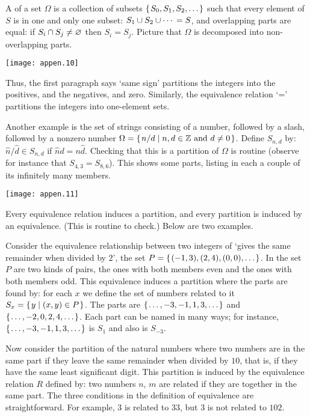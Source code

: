 A  
of a set \( \Omega \) is a collection of subsets
\( \mbox{$\{\hspace{0.1em}S_0,S_1,S_2,\ldots\hspace{0.1em}\}$} \) such that
every element of \( S \) is in one and only one subset:
\( S_1\cup S_2\cup \cdots{} = S \), and overlapping parts are equal:
if \( S_i\cap S_j\neq\varnothing \) then $S_i=S_j$.
Picture that \( \Omega \) is decomposed into non-overlapping parts.
\begin{center}
  \texttt{[image: appen.10]}
\end{center}
Thus, the first paragraph says `same sign' partitions
the integers into the positives, and the negatives, and zero.
Similarly, the equivalence relation `=' partitions the integers into
one-element sets.

Another example is the set of strings consisting of a number, followed
by a slash,
followed by a nonzero number
$\Omega=\mbox{$\{\hspace{0.1em}n/d\mid \text{$n,d\in\mathbb{Z}$ and $d\neq 0$}\hspace{0.1em}\}$}$.
Define $S_{n,d}$ by: $\hat{n}/\hat{d}\in S_{n,d}$ if 
$\hat{n}d=n\hat{d}$.
Checking that this is a partition of $\Omega$ is routine
(observe for instance that $S_{4,3}=S_{8,6}$).
This shows some parts, listing in each a couple of its infinitely many members. 
\begin{center}
  \texttt{[image: appen.11]}
\end{center}

Every equivalence relation induces a partition, and every 
partition is induced by an equivalence.
(This is routine to check.)
Below are two examples.
 
Consider the equivalence relationship between two integers of 
`gives the same remainder when divided by \( 2 \)',
the set \( P=\mbox{$\{\hspace{0.1em} (-1,3),(2,4),(0,0),\ldots\hspace{0.1em}\}$} \).
In the set $P$ are two kinds of pairs, the ones with both members even
and the ones with both members odd.
This equivalence induces a partition where the parts are found by: 
for each \( x \) we define the set of numbers related to
it \( S_x=\mbox{$\{\hspace{0.1em}y\mid (x,y)\in P\hspace{0.1em}\}$} \).
The parts are
\( \mbox{$\{\hspace{0.1em}\ldots,-3,-1,1,3,\ldots\hspace{0.1em}\}$} \) and
\( \mbox{$\{\hspace{0.1em}\ldots,-2,0,2,4,\ldots\hspace{0.1em}\}$} \).
Each part can be named in many ways; for instance,
\( \mbox{$\{\hspace{0.1em}\ldots,-3,-1,1,3,\ldots\hspace{0.1em}\}$} \) is \( S_1 \) and also is \( S_{-3} \).

Now consider the partition of the natural numbers where
two numbers are in the same part if they leave the same remainder when
divided by $10$, that is, if they have the same least significant digit.
This partition is induced by the equivalence relation $R$ defined by:
two numbers $n$, $m$ are related if they are together in the same part.
The three conditions in the definition of equivalence are straightforward.
For example, $3$ is related to $33$, but $3$ is not related to $102$.

